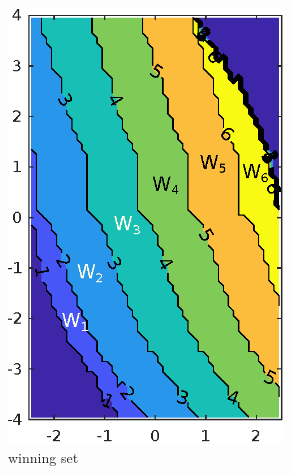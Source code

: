\begin{figure}
	\centering
	\begin{subfigure}[b]{0.235\textwidth}
		\centering
		\includegraphics[width=0.8\textwidth]{pic/win_set}
		\caption{winning set}
		\label{fig:win_set}
	\end{subfigure}
	\begin{subfigure}[b]{0.235\textwidth}
		\centering

\end{subfigure}
\end{figure}
